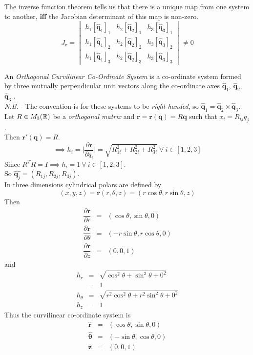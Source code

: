 \documentclass[11pt,a4paper]{article}
\begin{document}
The inverse function theorem tells us that there is a unique map from one system to another, \textbf{iff} the Jacobian determinant of this map is non-zero.
$$J_\textbf{r}=\begin{vmatrix} h_1[\hat{\textbf{q}}_1]_1 & h_2[\hat{\textbf{q}}_2]_1 & h_3[\hat{\textbf{q}}_3]_1 \\ h_1[\hat{\textbf{q}}_1]_2 & h_2[\hat{\textbf{q}}_2]_2 & h_3[\hat{\textbf{q}}_3]_2 \\ h_1[\hat{\textbf{q}}_1]_3 & h_2[\hat{\textbf{q}}_2]_3 & h_3[\hat{\textbf{q}}_3]_3 \end{vmatrix} \neq 0$$

An \textit{Orthogonal Curvilinear Co-Ordinate System} is a co-ordinate system formed by three mutually perpendicular unit vectors along the co-ordinate axes $\hat{\textbf{q}}_1$, $\hat{\textbf{q}}_2$, $\hat{\textbf{q}}_3$ .\\
\textit{N.B.} - The convention is for these systems to be \textit{right-handed}, so $\hat{\textbf{q}}_1=\hat{\textbf{q}}_2\times\hat{\textbf{q}}_3$.\\

Let $R\in M_3(\mathbb{R})$ be a \textit{orthogonal matrix} and $\textbf{r}=\textbf{r}(\textbf{q})=R\textbf{q}$ such that $x_i=R_{ij}q_j$.\\
Then $\textbf{r}'(\textbf{q})=R$.
$$\implies h_i=\bigg|\dfrac{\partial\textbf{r}}{\partial q_i}\bigg|=\sqrt{R_{1i}^2+R_{2i}^2+R_{3i}^2}\ \forall\ i\in[1,2,3]$$
Since $R^TR=I\implies h_i=1\ \forall\ i\in[1,2,3]$.\\
So $\hat{\textbf{q}_j}=(R_{1j}, R_{2j}, R_{3j})$.\\

In three dimensions cylindrical polars are defined by
$$(x,y,z)=\textbf{r}(r,\theta,z)=(r\cos\theta,r\sin\theta,z)$$
Then
\[\begin{array}{rcl}
\dfrac{\partial\textbf{r}}{\partial r}&=&(\cos\theta,\sin\theta,0)\\
\dfrac{\partial\textbf{r}}{\partial\theta}&=&(-r\sin\theta,r\cos\theta,0)\\
\dfrac{\partial\textbf{r}}{\partial z}&=&(0,0,1)
\end{array}\]
and
\[\begin{array}{rcl}
h_r&=&\sqrt{\cos^2\theta+\sin^2\theta+0^2}\\
&=&1\\
h_\theta&=&\sqrt{r^2\cos^2\theta+r^2\sin^2\theta+0^2}\\
h_z&=&1
\end{array}\]
Thus the curvilinear co-ordinate system is
\[\begin{array}{rcl}
\hat{\textbf{r}}&=&(\cos\theta,\sin\theta,0)\\
\hat{\pmb{\theta}}&=&(-\sin\theta,\cos\theta,0)\\
\hat{\textbf{z}}&=&(0,0,1)
\end{array}\]
\end{document}
